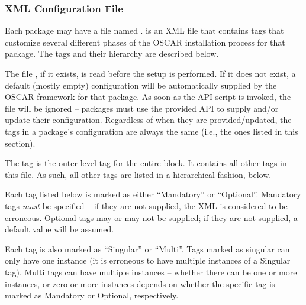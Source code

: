 
\subsubsection{XML Configuration File}
\label{sec:config-xml}

\begchange

Each package may have a file named .
 is an XML file that contains tags that customize
several different phases of the OSCAR installation process for that
package.  The tags and their hierarchy are described below.

The file , if it exists, is read before the
 setup is performed.  If it does not exist, a default
(mostly empty) configuration will be automatically supplied by the
OSCAR framework for that package.  As soon as the  API
script is invoked, the  file will be ignored --
packages must use the provided API to supply and/or update their
configuration.  Regardless of when they are provided/updated, the tags
in a package's configuration are always the same (i.e., the ones
listed in this section).

The  tag is the outer level tag for the entire block.
It contains all other tags in this file. As such, all other tags are
listed in a hierarchical fashion, below.  

Each tag listed below is marked as either ``Mandatory'' or
``Optional''.  Mandatory tags {\em must} be specified -- if they are
not supplied, the XML is considered to be erroneous.  Optional tags
may or may not be supplied; if they are not supplied, a default value
will be assumed.  

Each tag is also marked as ``Singular'' or ``Multi''.  Tags marked as
singular can only have one instance (it is erroneous to have multiple
instances of a Singular tag).  Multi tags can have multiple instances
-- whether there can be one or more instances, or zero or more
instances depends on whether the specific tag is marked as Mandatory
or Optional, respectively.

